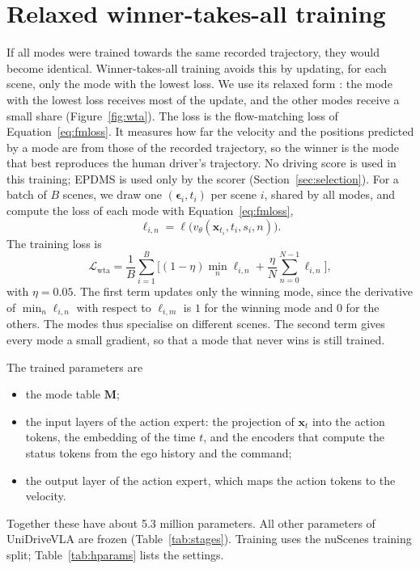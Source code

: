 \documentclass[11pt, a4paper, oneside]{book}
\begin{document}
\section{Relaxed winner-takes-all training}
\label{sec:wta}
If all modes were trained towards the same recorded trajectory, they would become identical.
Winner-takes-all training \cite{mcl} avoids this by updating, for each scene, only the mode
with the lowest loss. We use its relaxed form \cite{rupprecht}: the mode with the lowest loss
receives most of the update, and the other modes receive a small share
(Figure~\ref{fig:wta}). The loss is the flow-matching loss of Equation~\eqref{eq:fmloss}.
It measures how far the velocity and the positions predicted by a mode are from those of the
recorded trajectory, so the winner is the mode that best reproduces the human driver's
trajectory. No driving score is used in this training; EPDMS is used only by the scorer
(Section~\ref{sec:selection}). For a batch of $B$ scenes, we draw one $(\boldsymbol{\epsilon}_i,t_i)$
per scene $i$, shared by all modes, and compute the loss of each mode with
Equation~\eqref{eq:fmloss},
\begin{equation}
  \ell_{i,n}=\ell\big(v_\theta(\mathbf{x}_{t_i},t_i,s_i,n)\big) .
\end{equation}
The training loss is
\begin{equation}
  \mathcal{L}_{\mathrm{wta}}=\frac{1}{B}\sum_{i=1}^{B}\Big[(1-\eta)\min_{n}\ell_{i,n}
  +\frac{\eta}{N}\sum_{n=0}^{N-1}\ell_{i,n}\Big],
\end{equation}
with $\eta=0.05$. The first term updates only the winning mode, since the derivative of
$\min_n\ell_{i,n}$ with respect to $\ell_{i,m}$ is $1$ for the winning mode and $0$ for the
others. The modes thus specialise on different scenes. The second term gives every mode a small
gradient, so that a mode that never wins is still trained.



The trained parameters are
\begin{itemize}
  \item the mode table $\mathbf{M}$;
  \item the input layers of the action expert: the projection of $\mathbf{x}_t$ into the action
  tokens, the embedding of the time $t$, and the encoders that compute the status tokens from
  the ego history and the command;
  \item the output layer of the action expert, which maps the action tokens to the velocity.
\end{itemize}
Together these have about \num{5.3} million parameters. All other parameters of UniDriveVLA are frozen
(Table~\ref{tab:stages}). Training uses the nuScenes training split; Table~\ref{tab:hparams}
lists the settings.
\end{document}

